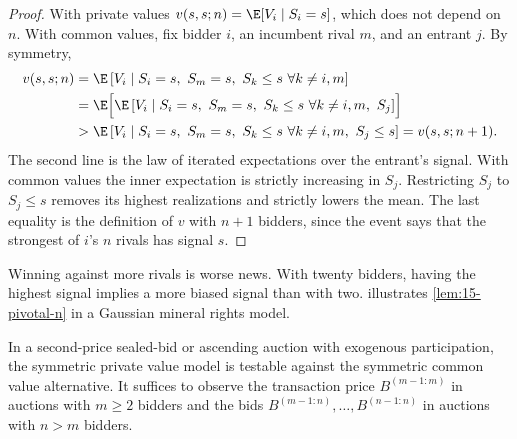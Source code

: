 \begin{proof}
With private values $v(s,s;n)=\E[V_i\mid S_i=s]$, which does not depend on $n$. With common values, fix
bidder $i$, an incumbent rival $m$, and an entrant $j$. By symmetry,
\begin{align*}
  v(s,s;n)&=\E\left[V_i\mid S_i=s,\ S_m=s,\ S_k\le s\ \forall k\ne i,m\right]\\
  &=\E\Bigl[\E\left[V_i\mid S_i=s,\ S_m=s,\ S_k\le s\ \forall k\ne i,m,\ S_j\right]\Bigr]\\
  &>\E\left[V_i\mid S_i=s,\ S_m=s,\ S_k\le s\ \forall k\ne i,m,\ S_j\le s\right]
  =v(s,s;n+1).
\end{align*}
The second line is the law of iterated expectations over the entrant's signal. With common values the inner
expectation is strictly increasing in $S_j$. Restricting $S_j$ to $S_j\le s$ removes its highest
realizations and strictly lowers the mean. The last equality is the definition of $v$ with $n+1$ bidders,
since the event says that the strongest of $i$'s $n$ rivals has signal $s$.
\end{proof}

Winning against more rivals is worse news. With twenty bidders, having the highest signal implies a more
biased signal than with two.  illustrates \cref{lem:15-pivotal-n} in a Gaussian mineral
rights model.

\begin{theorem}\label{thm:15-ah9}
In a second-price sealed-bid or ascending auction with exogenous participation, the symmetric private value
model is testable against the symmetric common value alternative. It suffices to observe the transaction price
$B^{(m-1:m)}$ in auctions with $m\ge2$ bidders and the bids $B^{(m-1:n)},\dots,B^{(n-1:n)}$ in auctions with
$n>m$ bidders.
\end{theorem}

